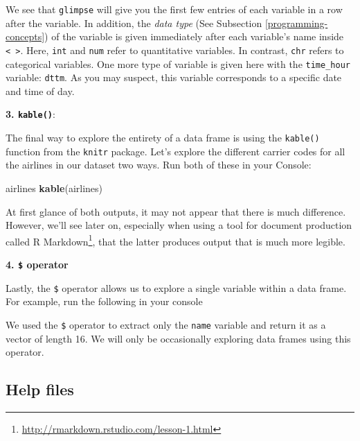 \documentclass[12pt,]{krantz}
\makeatletter
\newenvironment{Shaded}{\begin{snugshade}}{\end{snugshade}}
\newcommand{\KeywordTok}[1]{\textcolor[rgb]{0.27,0.27,0.27}{\textbf{#1}}}
\newcommand{\OperatorTok}[1]{\textcolor[rgb]{0.43,0.43,0.43}{\textbf{#1}}}
\newcommand{\NormalTok}[1]{#1}
\renewcommand{\href}[2]{#2\footnote{\url{#1}}}
\newenvironment{kframe}{%
\medskip{}
\setlength{\fboxsep}{.8em}
 \def\at@end@of@kframe{}%
 \ifinner\ifhmode%
  \def\at@end@of@kframe{\end{minipage}}%
  \begin{minipage}{\columnwidth}%
 \fi\fi%
 \def\FrameCommand##1{\hskip\@totalleftmargin \hskip-\fboxsep
 \colorbox{shadecolor}{##1}\hskip-\fboxsep
     \hskip-\linewidth \hskip-\@totalleftmargin \hskip\columnwidth}%
 \MakeFramed {\advance\hsize-\width
   \@totalleftmargin\z@ \linewidth\hsize
   \@setminipage}}%
 {\par\unskip\endMakeFramed%
 \at@end@of@kframe}
\renewenvironment{Shaded}{\begin{kframe}}{\end{kframe}}
\theoremstyle{definition}
\theoremstyle{definition}
\theoremstyle{definition}
\theoremstyle{remark}
\makeatother
\begin{document}
We see that \texttt{glimpse} will give you the first few entries of each
variable in a row after the variable. In addition, the \emph{data type}
(See Subsection \ref{programming-concepts}) of the variable is given
immediately after each variable's name inside
\texttt{\textless{}\ \textgreater{}}. Here, \texttt{int} and
\texttt{num} refer to quantitative variables. In contrast, \texttt{chr}
refers to categorical variables. One more type of variable is given here
with the \texttt{time\_hour} variable: \texttt{dttm}. As you may
suspect, this variable corresponds to a specific date and time of day.

\textbf{3. \texttt{kable()}}:

The final way to explore the entirety of a data frame is using the
\texttt{kable()} function from the \texttt{knitr} package. Let's explore
the different carrier codes for all the airlines in our dataset two
ways. Run both of these in your Console:

\begin{Shaded}
\begin{Highlighting}[]
\NormalTok{airlines}
\KeywordTok{kable}\NormalTok{(airlines)}
\end{Highlighting}
\end{Shaded}

At first glance of both outputs, it may not appear that there is much
difference. However, we'll see later on, especially when using a tool
for document production called
\href{http://rmarkdown.rstudio.com/lesson-1.html}{R Markdown}, that the
latter produces output that is much more legible.

\textbf{4. \texttt{\$} operator}

Lastly, the \texttt{\$} operator allows us to explore a single variable
within a data frame. For example, run the following in your console

\begin{Shaded}
\end{Shaded}

We used the \texttt{\$} operator to extract only the \texttt{name}
variable and return it as a vector of length 16. We will only be
occasionally exploring data frames using this operator.

\subsection{Help files}\label{help-files}
\end{document}

